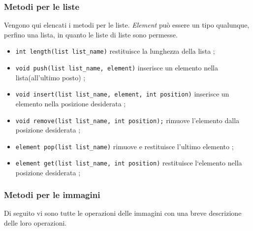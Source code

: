 \documentclass[10pt]{article}
\begin{document}
\subsubsection{Metodi per le liste}
Vengono qui elencati i metodi per le liste. \textit{Element} può essere un tipo qualunque, perfino una lista, in quanto le liste di liste sono permesse.\\

\begin{itemize}
\item \texttt{int length(list list\_name)} restituisce la lunghezza della lista ;
\item \texttt{void push(list list\_name, element)} inserisce un elemento nella lista(all'ultimo posto) ;
\item \texttt{void insert(list list\_name, element, int position)} inserisce un elemento nella posizione desiderata ;
\item \texttt{void remove(list list\_name, int position);} rimuove l’elemento dalla posizione desiderata ;
\item \texttt{element pop(list list\_name)} rimuove e restituisce l’ultimo elemento ;	
\item \texttt{element get(list list\_name, int position)} restituisce l‘elemento nella posizione desiderata ;
\end{itemize}

\subsubsection{Metodi per le immagini}
Di seguito vi sono tutte le operazioni delle immagini con una breve descrizione delle loro operazioni.\\
\end{document}
